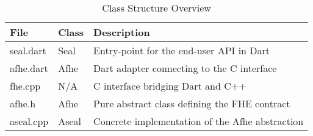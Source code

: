 \begin{table}[t]
\caption{Class Structure Overview}
\centering
\begin{tabular}{|l|l|p{9cm}|}
\hline
\textbf{File} & \textbf{Class} & \textbf{Description} \\ \hline
seal.dart    & Seal    & Entry-point for the end-user API in Dart \\ \hline
afhe.dart    & Afhe    & Dart adapter connecting to the C interface \\ \hline
fhe.cpp      & N/A     & C interface bridging Dart and C++ \\ \hline
afhe.h       & Afhe    & Pure abstract class defining the FHE contract \\ \hline
aseal.cpp    & Aseal   & Concrete implementation of the Afhe abstraction \\ \hline
\end{tabular}
\label{table:class-structure}
\end{table}
